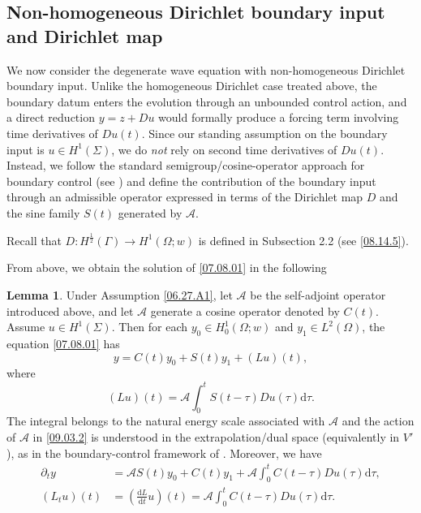 \documentclass[preprint,12pt]{elsarticle}
\theoremstyle{definition}   %
\newtheorem{lemma}[theorem]{Lemma}
\numberwithin{equation}{section}
\def\pt{\partial}
\def\pt{\partial}
\def\Om{\Omega}
\def\Ga{\Gamma}
\def\f{\frac}
\def\df{\mathrm d}
\def\mcA{\mathcal{A}}
\begin{document}
\subsection{Non-homogeneous Dirichlet boundary input and Dirichlet map}

We now consider the degenerate wave equation with non-homogeneous Dirichlet boundary input. Unlike the homogeneous Dirichlet case treated above, the boundary datum enters the evolution through an unbounded control action, and a direct reduction $y=z+Du$ would formally produce a forcing term involving time derivatives of $Du(t)$. Since our standing assumption on the boundary input is $u\in H^1(\Sigma)$, we do \emph{not} rely on second time derivatives of $Du(t)$. Instead, we follow the standard semigroup/cosine-operator approach for boundary control (see \cite{Lasiecka1,Lasiecka2}) and define the contribution of the boundary input through an admissible operator expressed in terms of the Dirichlet map $D$ and the sine family $S(t)$ generated by $\mcA$.

Recall that $D: H^{\f{1}{2}}(\Ga)\to H^1(\Om;w)$ is defined in Subsection 2.2 (see \eqref{08.14.5}).

From above, we obtain the solution of \eqref{07.08.01} in the following 

\begin{lemma}\label{08.19.L1}
	Under Assumption \ref{06.27.A1}, let $\mcA$ be the self-adjoint operator introduced above, and let $\mcA$ generate a cosine operator denoted by $C(t)$. Assume $u\in H^1(\Sigma)$. Then for each $y_0\in H_0^1(\Om;w)$ and $y_1\in L^2(\Om)$, the equation \eqref{07.08.01} has 
	\begin{equation}\label{08.15.6}
		y=C(t)y_0+S(t)y_1+(Lu)(t), 
	\end{equation}
	where 
	\begin{equation}\label{09.03.2}
		(Lu)(t)=\mcA\int_0^tS(t-\tau)Du(\tau)\df\tau. 
	\end{equation}
	The integral belongs to the natural energy scale associated with $\mcA$ and the action of $\mcA$ in \eqref{09.03.2} is understood in the extrapolation/dual space (equivalently in $V'$), as in the boundary-control framework of \cite{Lasiecka1,Lasiecka2}.
	Moreover, we have 
	\begin{equation}\label{09.03.4}
		\begin{split} 
			\pt_ty 
			&=\mcA S(t) y_0+C(t) y_1+\mcA \int_0^t C(t-\tau)Du(\tau)\df \tau,\\
			(L_tu)(t)
			&=\left(\f{\df L}{\df t}u\right)(t)=\mcA\int_0^t C(t-\tau)Du(\tau)\df\tau. 
		\end{split} 
	\end{equation}
\end{lemma}
\end{document}
